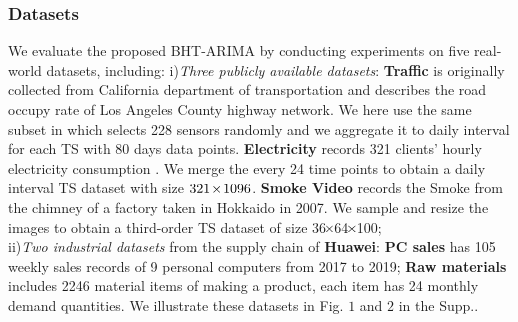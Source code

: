 \documentclass[letterpaper]{article} %
\numberwithin{theorem}{section}
\begin{document}
\subsubsection{Datasets}
We  evaluate the proposed BHT-ARIMA by conducting  experiments on five real-world datasets, including: i)\textit{Three publicly available datasets}:
\textbf{Traffic}  is originally collected from California department of transportation   and describes the road occupy rate of Los Angeles County highway network. We here use the same subset  in  \cite{yu2017spatio} which selects 228 sensors randomly  and we aggregate it to daily interval  for each TS with  80 days data points.
\textbf{Electricity}  records 321 clients' hourly electricity consumption \cite{lai2018modeling}. We merge the  every 24 time points to obtain  a daily interval TS dataset with size $321  \hspace{-0.05cm}\times \hspace{-0.05cm} 1096$.
\textbf{Smoke Video} records the Smoke  from the chimney of a factory taken in Hokkaido in 2007. We sample  and resize the images to obtain a  third-order TS dataset of size 36$  \hspace{-0.05cm}\times  \hspace{-0.05cm}$64$  \hspace{-0.05cm}\times  \hspace{-0.05cm}$100;  \\
ii)\textit{Two industrial datasets} from the supply chain  of   \textbf{Huawei}:
\textbf{PC sales} has  105 weekly sales records of 9 personal computers from 2017 to  2019; \textbf{Raw materials} includes  2246  material  items of   making a product, each item has 24 monthly demand quantities.
We illustrate these datasets in Fig. $1$  and  $2$ in the {Supp..}
\end{document}
